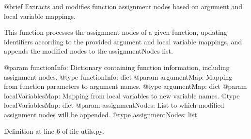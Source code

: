 \begin{DoxyVerb}@brief Extracts and modifies function assignment nodes based on argument and local variable mappings.

This function processes the assignment nodes of a given function, updating identifiers according to the provided 
argument and local variable mappings, and appends the modified nodes to the assignmentNodes list.

@param functionInfo: Dictionary containing function information, including assignment nodes.
@type functionInfo: dict
@param argumentMap: Mapping from function parameters to argument names.
@type argumentMap: dict
@param localVariablesMap: Mapping from local variables to new variable names.
@type localVariablesMap: dict
@param assignmentNodes: List to which modified assignment nodes will be appended.
@type assignmentNodes: list
\end{DoxyVerb}
 

Definition at line 6 of file utils.\+py.


